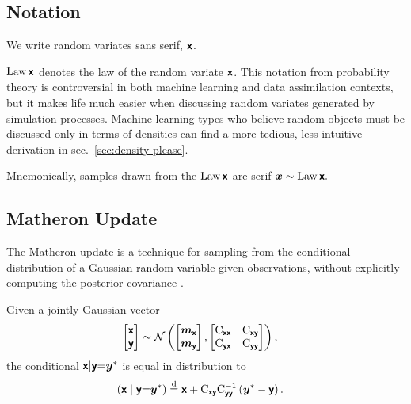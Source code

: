 \documentclass{article}
\begin{document}
\subsection{Notation}

We write random variates sans serif, $\boldsymbol{\mathsf{x}}$.

$\operatorname{Law}{\boldsymbol{\mathsf{x}}}$ denotes the law of the random variate $\boldsymbol{\mathsf{x}}$.
This notation from probability theory is controversial in both machine learning and data assimilation contexts, but it makes life much easier when discussing random variates generated by simulation processes.
Machine-learning types who believe random objects must be discussed only in terms of densities can find a more tedious, less intuitive derivation in sec.~\ref{sec:density-please}.

Mnemonically, samples drawn from the $\operatorname{Law}{\boldsymbol{\mathsf{x}}}$ are serif $\boldsymbol{x}\sim\operatorname{Law}{\boldsymbol{\mathsf{x}}}.$

\subsection{Matheron Update}

The Matheron update is a technique for sampling from the conditional distribution of a Gaussian random variable given observations, without explicitly computing the posterior covariance \citep{Doucet2010Note,Wilson2020Efficiently,Wilson2021Pathwise}.

\begin{lemma}
Given a jointly Gaussian vector
\begin{align}
    \begin{bmatrix} \boldsymbol{\mathsf{x}} \\ \boldsymbol{\mathsf{y}} \end{bmatrix}
    &\sim \mathcal{N}\left(\begin{bmatrix} \boldsymbol{m}_{\boldsymbol{\mathsf{x}}} \\ \boldsymbol{m}_{\boldsymbol{\mathsf{y}}} \end{bmatrix}, \begin{bmatrix} \mathrm{C}_{\boldsymbol{\mathsf{xx}}} & \mathrm{C}_{\boldsymbol{\mathsf{xy}}} \\ \mathrm{C}_{\boldsymbol{\mathsf{yx}}} & \mathrm{C}_{\boldsymbol{\mathsf{yy}}} \end{bmatrix}\right), \label{eq:joint-gaussian}
\end{align}
the conditional $\boldsymbol{\mathsf{x}} | \boldsymbol{\mathsf{y}} {=} \boldsymbol{y}^*$ is equal in distribution to
\begin{align}
    \left(\boldsymbol{\mathsf{x}} \mid \boldsymbol{\mathsf{y}} {=} \boldsymbol{y}^*\right)
    &\stackrel{\mathrm{d}}{=} \boldsymbol{\mathsf{x}} + \mathrm{C}_{\boldsymbol{\mathsf{xy}}} \mathrm{C}_{\boldsymbol{\mathsf{yy}}}^{-1} \left( \boldsymbol{y}^* - \boldsymbol{\mathsf{y}} \right).
    \label{eq:matheron-update}
\end{align}
\end{lemma}
\end{document}
